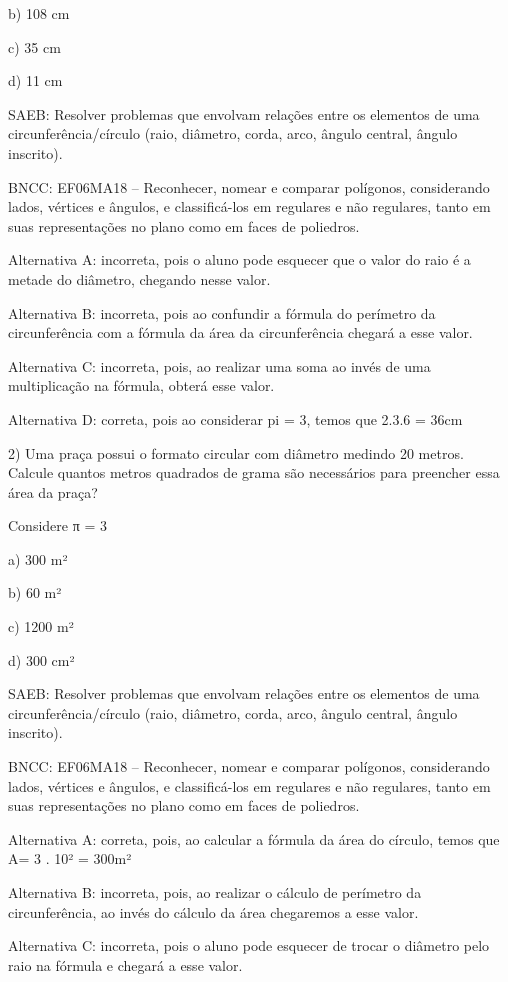 b) 108 cm

c) 35 cm

d) 11 cm

SAEB: Resolver problemas que envolvam relações entre os elementos de uma
circunferência/círculo (raio, diâmetro, corda, arco, ângulo central,
ângulo inscrito).

BNCC: EF06MA18 -- Reconhecer, nomear e comparar polígonos, considerando
lados, vértices e ângulos, e classificá-los em regulares e não
regulares, tanto em suas representações no plano como em faces de
poliedros.

Alternativa A: incorreta, pois o aluno pode esquecer que o valor do raio
é a metade do diâmetro, chegando nesse valor.

Alternativa B: incorreta, pois ao confundir a fórmula do perímetro da
circunferência com a fórmula da área da circunferência chegará a esse
valor.

Alternativa C: incorreta, pois, ao realizar uma soma ao invés de uma
multiplicação na fórmula, obterá esse valor.

Alternativa D: correta, pois ao considerar pi = 3, temos que 2.3.6 =
36cm

2) Uma praça possui o formato circular com diâmetro medindo 20 metros.
Calcule quantos metros quadrados de grama são necessários para preencher
essa área da praça?

Considere π = 3

a) 300 m²

b) 60 m²

c) 1200 m²

d) 300 cm²

SAEB: Resolver problemas que envolvam relações entre os elementos de uma
circunferência/círculo (raio, diâmetro, corda, arco, ângulo central,
ângulo inscrito).

BNCC: EF06MA18 -- Reconhecer, nomear e comparar polígonos, considerando
lados, vértices e ângulos, e classificá-los em regulares e não
regulares, tanto em suas representações no plano como em faces de
poliedros.

Alternativa A: correta, pois, ao calcular a fórmula da área do círculo,
temos que A= 3 . 10² = 300m²

Alternativa B: incorreta, pois, ao realizar o cálculo de perímetro da
circunferência, ao invés do cálculo da área chegaremos a esse valor.

Alternativa C: incorreta, pois o aluno pode esquecer de trocar o
diâmetro pelo raio na fórmula e chegará a esse valor.

